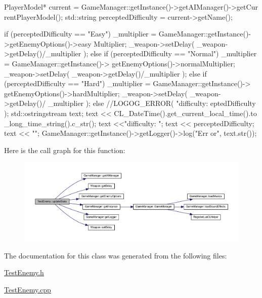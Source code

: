 \begin{DoxyCode}
{
        PlayerModel* current = GameManager::getInstance()->getAIManager()->getCur
      rentPlayerModel();
        std::string perceptedDifficulty = current->getName();

        if (perceptedDifficulty == "Easy")
        {
                _multiplier = GameManager::getInstance()->getEnemyOptions()->easy
      Multiplier;
                _weapon->setDelay( _weapon->getDelay()/_multiplier );
        } 
        else
        {
                if (perceptedDifficulty == "Normal")
                {
                        _multiplier = GameManager::getInstance()->
      getEnemyOptions()->normalMultiplier;
                        _weapon->setDelay( _weapon->getDelay()/_multiplier );
                }
                else
                {
                        if (perceptedDifficulty == "Hard")
                        {
                                _multiplier = GameManager::getInstance()->
      getEnemyOptions()->hardMultiplier;
                                _weapon->setDelay( _weapon->getDelay()/
      _multiplier );
                        } 
                        else
                        {
                                //LOGOG_ERROR( "\nUnknown difficulty: %
      eptedDifficulty );
                                std::ostringstream text;
                                text << CL_DateTime().get_current_local_time().to
      _long_time_string().c_str();
                                text <<"\nUnknown difficulty: ";
                                text << perceptedDifficulty;
                                text << "\n";
                                GameManager::getInstance()->getLogger()->log("Err
      or", text.str());
                        }
                }
        }
}
\end{DoxyCode}


Here is the call graph for this function:
\nopagebreak
\begin{figure}[H]
\begin{center}
\leavevmode
\includegraphics[width=400pt]{dd/d78/class_test_enemy_a1c7eaf9e99a58a5815d14c929c09cf38_cgraph}
\end{center}
\end{figure}




The documentation for this class was generated from the following files:\begin{DoxyCompactItemize}
\item 
\hyperlink{_test_enemy_8h}{TestEnemy.h}\item 
\hyperlink{_test_enemy_8cpp}{TestEnemy.cpp}\end{DoxyCompactItemize}
